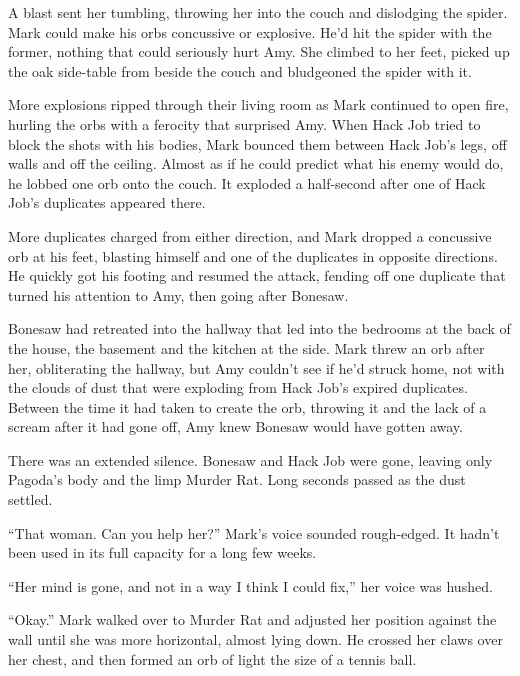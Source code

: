 A blast sent her tumbling, throwing her into the couch and dislodging the spider.  Mark could make his orbs concussive or explosive.  He'd hit the spider with the former, nothing that could seriously hurt Amy.  She climbed to her feet, picked up the oak side-table from beside the couch and bludgeoned the spider with it.



More explosions ripped through their living room as Mark continued to open fire, hurling the orbs with a ferocity that surprised Amy.  When Hack Job tried to block the shots with his bodies, Mark bounced them between Hack Job's legs, off walls and off the ceiling.  Almost as if he could predict what his enemy would do, he lobbed one orb onto the couch.  It exploded a half-second after one of Hack Job's duplicates appeared there.



More duplicates charged from either direction, and Mark dropped a concussive orb at his feet, blasting himself and one of the duplicates in opposite directions.  He quickly got his footing and resumed the attack, fending off one duplicate that turned his attention to Amy, then going after Bonesaw.



Bonesaw had retreated into the hallway that led into the bedrooms at the back of the house, the basement and the kitchen at the side.  Mark threw an orb after her, obliterating the hallway, but Amy couldn't see if he'd struck home, not with the clouds of dust that were exploding from Hack Job's expired duplicates.  Between the time it had taken to create the orb, throwing it and the lack of a scream after it had gone off, Amy knew Bonesaw would have gotten away.



There was an extended silence.  Bonesaw and Hack Job were gone, leaving only Pagoda's body and the limp Murder Rat.  Long seconds passed as the dust settled.



``That woman.  Can you help her?''  Mark's voice sounded rough-edged.  It hadn't been used in its full capacity for a long few weeks.



``Her mind is gone, and not in a way I think I could fix,'' her voice was hushed.



``Okay.''  Mark walked over to Murder Rat and adjusted her position against the wall until she was more horizontal, almost lying down.  He crossed her claws over her chest, and then formed an orb of light the size of a tennis ball.



